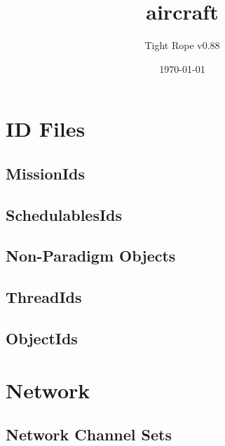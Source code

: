 \documentclass[10pt,a4paper]{article}
\title{aircraft}
\author{Tight Rope v0.88}
\date{\today}
\begin{document}
\maketitle

\section{ID Files}
\subsection{MissionIds}

\newpage

\subsection{SchedulablesIds}

\newpage

\subsection{Non-Paradigm Objects}
\newpage

\subsection{ThreadIds}

\newpage

\subsection{ObjectIds}

\newpage

\section{Network}
\subsection{Network Channel Sets}




{}
\end{document}
